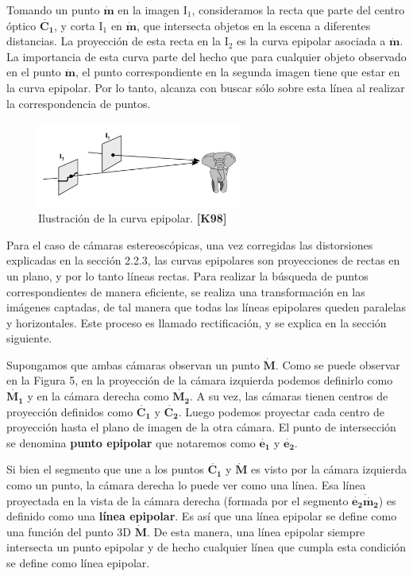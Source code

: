 \documentclass[11pt,a4paper,titlepage]{article}
\newcommand{\Cite}[1]{\textbf{[#1]}}
\newcommand{\TwoCart}[1]{\ensuremath{\mathbf{\dot{#1}}}}
\newcommand{\ThreeCart}[1]{\ensuremath{\mathbf{\dot{#1}}}}
\newcommand{\Plane}[1]{\ensuremath{\mathrm{#1}}}
\newcommand{\Figure}[1]{Figura #1}
\newcommand{\Section}[1]{#1}
\begin{document}
Tomando un punto \TwoCart{m} en la imagen \Plane{I_1}, consideramos la recta que parte del centro óptico \ThreeCart{C_1}, y corta \Plane{I_1} en \TwoCart{m}, que intersecta objetos en la escena a diferentes distancias. La proyección de esta recta en la \Plane{I_2} es la curva epipolar asociada a \TwoCart{m}. La importancia de esta curva parte del hecho que para cualquier objeto observado en el punto \TwoCart{m}, el punto correspondiente en la segunda imagen tiene que estar en la curva epipolar. Por lo tanto, alcanza con buscar sólo sobre esta línea al realizar la correspondencia de puntos.


\begin{figure}[h!]

  \centering
    \includegraphics[width=0.6\textwidth]{f4.png}
  \caption{Ilustración de la curva epipolar. \Cite{K98}}
\end{figure}

Para el caso de cámaras estereoscópicas, una vez corregidas las distorsiones explicadas en la sección \Section{2.2.3}, las curvas epipolares son proyecciones de rectas en un plano, y por lo tanto líneas rectas. Para realizar la búsqueda de puntos correspondientes de manera eficiente, se realiza una transformación en las imágenes captadas, de tal manera que todas las líneas epipolares queden paralelas y horizontales. Este proceso es llamado rectificación, y se explica en la sección siguiente.

Supongamos que ambas cámaras observan un punto \ThreeCart{M}. Como se puede observar en la \Figure{5}, en la proyección de la cámara izquierda podemos definirlo como \ThreeCart{M_1} y en la cámara derecha como \ThreeCart{M_2}. A su vez, las cámaras tienen centros de proyección definidos como \ThreeCart{C_1}  y \ThreeCart{C_2}. Luego podemos proyectar cada centro de proyección hasta el plano de imagen de la otra cámara. El punto de intersección se denomina \textbf{punto epipolar} que notaremos como \TwoCart{e_1} y \TwoCart{e_2}.

Si bien el segmento que une a los puntos \ThreeCart{C_1} y \ThreeCart{M} es visto por la cámara izquierda como un punto, la cámara derecha lo puede ver como una línea. Esa línea proyectada en la vista de la cámara derecha (formada por el segmento $\overline{\TwoCart{e_2}\TwoCart{m_2}}$) es definido como una \textbf{línea epipolar}. Es así que una línea epipolar se define como una función del punto 3D \ThreeCart{M}. De esta manera, una línea epipolar siempre intersecta un punto epipolar y de hecho cualquier línea que cumpla esta condición se define como línea epipolar.
\end{document}
